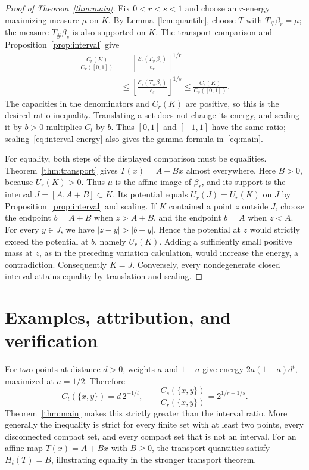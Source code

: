 \documentclass[11pt]{article}
\theoremstyle{remark}
\newcommand{\push}{_{\#}}
\begin{document}
\begin{proof}[Proof of Theorem~\ref{thm:main}]
Fix $0<r<s<1$ and choose an $r$-energy maximizing measure $\mu$ on $K$.
By Lemma~\ref{lem:quantile}, choose $T$ with $T\push\beta_r=\mu$;
the measure $T\push\beta_s$ is also supported on $K$.
The transport comparison and Proposition~\ref{prop:interval} give
\begin{align*}
 \frac{C_r(K)}{C_r([0,1])}
 &=\left[\frac{\mathcal E_r(T\push\beta_r)}{e_r}\right]^{1/r}\\
 &\leq\left[\frac{\mathcal E_s(T\push\beta_s)}{e_s}\right]^{1/s}
 \leq\frac{C_s(K)}{C_s([0,1])}.
\end{align*}
The capacities in the denominators and $C_r(K)$ are positive, so this
is the desired ratio inequality. Translating a set does not change its
energy, and scaling it by $b>0$ multiplies $C_t$ by $b$. Thus $[0,1]$
and $[-1,1]$ have the same ratio; scaling~\eqref{eq:interval-energy}
also gives the gamma formula in~\eqref{eq:main}.

For equality, both steps of the displayed comparison must be equalities.
Theorem~\ref{thm:transport} gives $T(x)=A+Bx$ almost everywhere.
Here $B>0$, because $U_r(K)>0$. Thus $\mu$ is the affine image of
$\beta_r$, and its support is the interval $J=[A,A+B]\subset K$.
Its potential equals $U_r(J)=U_r(K)$ on $J$ by
Proposition~\ref{prop:interval} and scaling. If $K$ contained a point
$z$ outside $J$, choose the endpoint $b=A+B$ when $z>A+B$, and the
endpoint $b=A$ when $z<A$. For every $y\in J$, we have
$|z-y|>|b-y|$. Hence the potential at $z$ would strictly exceed the
potential at $b$, namely $U_r(K)$.
Adding a sufficiently small positive mass at $z$, as in the preceding
variation calculation, would increase the energy, a contradiction.
Consequently $K=J$. Conversely, every nondegenerate closed interval
attains equality by translation and scaling.
\end{proof}

\section{Examples, attribution, and verification}

For two points at distance $d>0$, weights $a$ and $1-a$ give energy
$2a(1-a)d^t$, maximized at $a=1/2$. Therefore
\[
 C_t(\{x,y\})=d\,2^{-1/t},\qquad
 \frac{C_s(\{x,y\})}{C_r(\{x,y\})}=2^{1/r-1/s}.
\]
Theorem~\ref{thm:main} makes this strictly greater than the interval
ratio. More generally the inequality is strict for every finite set
with at least two points, every disconnected compact set, and every
compact set that is not an interval. For an affine map $T(x)=A+Bx$ with
$B\geq0$,
the transport quantities satisfy $H_t(T)=B$, illustrating equality
in the stronger transport theorem.
\end{document}
